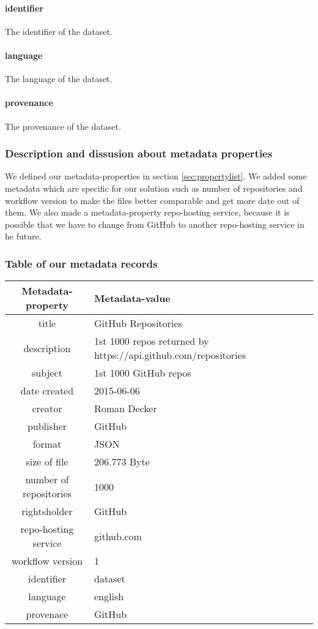 \paragraph{identifier}
The identifier of the dataset.
\paragraph{language}
The language of the dataset.
\paragraph{provenance}
The provenance of the dataset.

\subsubsection{Description and dissusion about metadata
properties}\label{sec:descprop}

We defined our metadata-properties in section \ref{sec:propertylist}. We added
some metadata which are specific for our solution such as number of repositories
and workflow version to make the files better comparable and get more date out
of them. We also made a metadata-property repo-hosting service, because it is
possible that we have to change from GitHub to another repo-hosting service in
he future.


\subsubsection{Table of our metadata records}\label{sec:metadatarecordtable}

\begin{tabular}{|c|l|}
    \hline
    \textbf{Metadata-property} & \textbf{Metadata-value} \\
    \hline
    title & GitHub Repositories \\
    \hline
    description & 1st 1000 repos returned by https://api.github.com/repositories  \\
    \hline
    subject & 1st 1000 GitHub repos \\
    \hline
    date created & 2015-06-06 \\
    \hline
     creator & Roman Decker \\
    \hline
     publisher & GitHub \\
    \hline
     format & JSON \\
    \hline
     size of file & 206.773 Byte \\
    \hline
     number of repositories & 1000 \\
    \hline
     rightsholder & GitHub \\
    \hline
     repo-hosting service & github.com \\
    \hline
     workflow version & 1 \\
    \hline
     identifier & dataset \\
    \hline
     language & english \\
    \hline
     provenace & GitHub \\
    \hline
\end{tabular}
